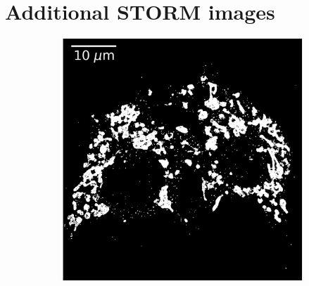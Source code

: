 \section{Additional STORM images}

\begin{figure}
    \begin{subfigure}{0.49\textwidth}
        \includegraphics[width=\textwidth]{figures/mitochondria_image5.png}
        \caption{}
    \end{subfigure}
    \begin{subfigure}{0.49\textwidth}

\end{subfigure}
\end{figure}
